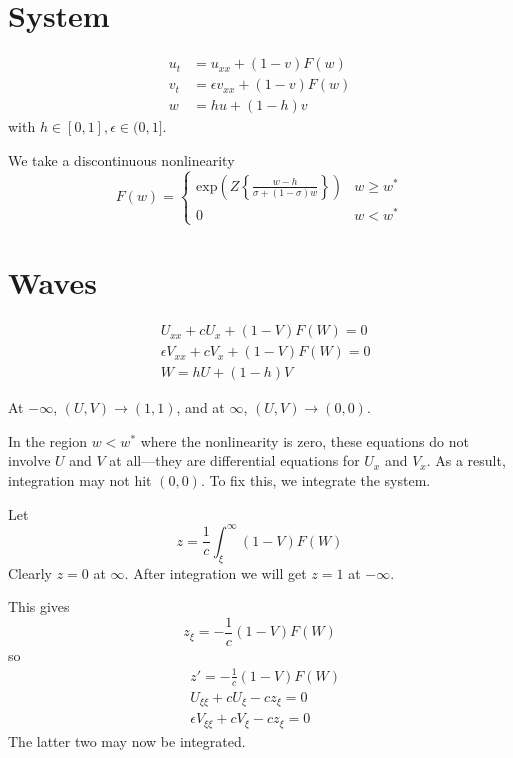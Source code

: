 \documentclass[10pt]{article}
\begin{document}
\section{System}
\begin{align}
u_t &= u_{xx} + (1-v)F(w) \\
v_t &= \epsilon v_{xx} + (1-v)F(w)\\
w &= hu+(1-h)v
\end{align}
with $h \in [0,1], \epsilon \in (0,1]$.

We take a discontinuous nonlinearity
\begin{equation}
F(w) = \left\{\begin{array}{ll}
\mathrm{exp}\left(Z\left\{\frac{w-h}{\sigma+(1-\sigma)w} \right\} \right) & w \geq w^*\\
0 & w < w^*
\end{array} \right.
\end{equation}


\section{Waves}
\begin{align}
&U_{xx} + cU_x + (1-V)F(W) = 0\\
&\epsilon V_{xx} + cV_x + (1-V)F(W) = 0\\
&W = hU+(1-h)V
\end{align}

At $-\infty$, $(U,V) \to (1,1)$, and at $\infty$, $(U,V) \to (0,0)$.

In the region $w < w^*$ where the nonlinearity is zero, these equations do not involve $U$ and $V$ at all---they are differential equations for $U_x$ and $V_x$.
As a result, integration may not hit $(0,0)$. To fix this, we integrate the system.

Let
\begin{equation}
z = \frac{1}{c}\int_\xi^\infty (1-V)F(W)
\end{equation}
Clearly $z=0$ at $\infty$.  After integration we will get $z=1$ at $-\infty$.

This gives
\begin{equation}
z_\xi = -\frac{1}{c}(1-V)F(W)
\end{equation}
so
\begin{align}
&z'= -\frac{1}{c}(1-V)F(W)\\
&U_{\xi\xi}+cU_\xi-cz_\xi = 0\\
&\epsilon V_{\xi\xi}+cV_\xi-cz_\xi = 0
\end{align}
The latter two may now be integrated.
\end{document}
